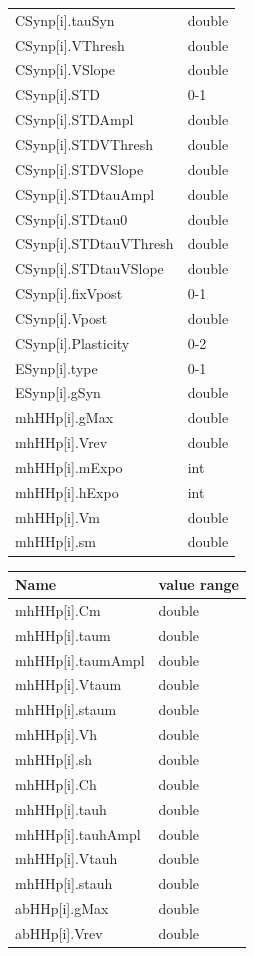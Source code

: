 \documentclass{article}
\begin{document}
\begin{table}
\begin{tabular}[t]{|ll|}
CSynp[i].tauSyn & double \\
CSynp[i].VThresh & double \\
CSynp[i].VSlope & double \\
CSynp[i].STD & 0-1 \\
CSynp[i].STDAmpl & double \\
CSynp[i].STDVThresh & double \\
CSynp[i].STDVSlope & double \\
CSynp[i].STDtauAmpl & double \\
CSynp[i].STDtau0 & double \\
CSynp[i].STDtauVThresh & double \\
CSynp[i].STDtauVSlope & double \\
CSynp[i].fixVpost & 0-1 \\
CSynp[i].Vpost & double \\
CSynp[i].Plasticity & 0-2 \\
ESynp[i].type & 0-1 \\
ESynp[i].gSyn & double \\
mhHHp[i].gMax & double \\
mhHHp[i].Vrev & double \\
mhHHp[i].mExpo & int \\
mhHHp[i].hExpo & int \\
mhHHp[i].Vm & double \\
mhHHp[i].sm & double \\ \hline
\end{tabular}
\quad 
\begin{tabular}[t]{|ll|}
\hline
{\bf Name} & {\bf value range} \\
\hline
mhHHp[i].Cm & double \\
mhHHp[i].taum & double \\
mhHHp[i].taumAmpl & double \\
mhHHp[i].Vtaum & double \\
mhHHp[i].staum & double \\
mhHHp[i].Vh & double \\
mhHHp[i].sh & double \\
mhHHp[i].Ch & double \\
mhHHp[i].tauh & double \\
mhHHp[i].tauhAmpl & double \\
mhHHp[i].Vtauh & double \\
mhHHp[i].stauh & double \\
abHHp[i].gMax & double \\
abHHp[i].Vrev & double \\

\end{tabular}
\end{table}
\end{document}
